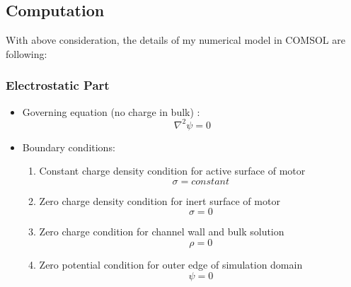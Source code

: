 \documentclass[fontsize=11pt, %
                             paper=a4, %
                             twoside, %
                             captions=tableheading,
                             index=totoc,
                             hyperref]{labbook}
\begin{document}
\begin{addmargin}[4cm]{0cm}
\subsection*{Computation}
With above consideration, the details of my numerical model in COMSOL are following:
\subsubsection{Electrostatic Part}
\begin{itemize}
\item Governing equation (no charge in bulk) :
\begin{equation}
\nabla^2\psi=0
\end{equation}
\item Boundary conditions:
\begin{enumerate}
\item
Constant charge density condition for active surface of motor
\begin{equation}
\sigma=constant
\end{equation}
\item
Zero charge density condition for inert surface of motor
\begin{equation}
\sigma=0
\end{equation}
\item
Zero charge condition for channel wall and bulk solution
\begin{equation}
\rho=0
\end{equation}
\item
Zero potential condition for outer edge of simulation domain
\begin{equation}
\psi=0
\end{equation}
\end{enumerate}
\end{itemize}

\end{addmargin}
\end{document}
